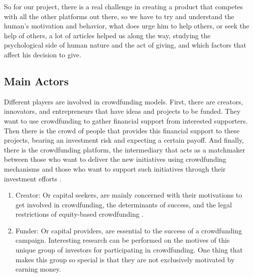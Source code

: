 So for our project, there is a real challenge in creating a product that competes with all the other platforms out there, so we have to try and understand the human's motivation and behavior, what does urge him to help others, or seek the help of others,
a lot of articles helped us along the way, studying the psychological side of human nature and the act of giving, and which factors that affect his decision to give.

\subsection{Main Actors}
Different players are involved in crowdfunding models. First, there are creators, innovators, and entrepreneurs that have ideas and
projects to be funded. They want to use crowdfunding to gather financial support from interested supporters.
Then there is the crowd of people that provides this financial support to these projects, bearing an investment
risk and expecting a certain payoff. And finally, there is the crowdfunding platform, the intermediary that acts
as a matchmaker between those who want to deliver the new initiatives using crowdfunding mechanisms
and those who want to support such initiatives through their investment efforts \cite{crwdfun:transform}.
\begin{enumerate}
      \item Creator:
            Or capital seekers, are mainly concerned with their motivations to get involved in crowdfunding, the determinants of success, and the legal restrictions of equity-based crowdfunding \cite{10.1007/978-3-319-18017-5_3}.

      \item Funder:
      Or capital providers, are essential to the success of a crowdfunding campaign. Interesting research can be performed on the motives of this unique group of investors for participating in crowdfunding. One thing that
            makes this group so special is that they are not exclusively motivated by earning money.

\end{enumerate}
